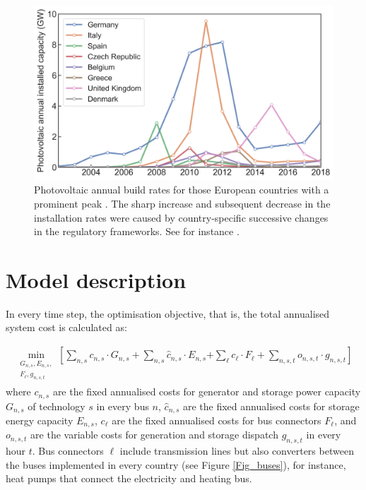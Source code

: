 \documentclass[3p]{elsarticle} %
\begin{document}
\begin{figure}[!h]
\centering
\includegraphics[width=12cm]{figures/installation_rates_PV.png}
\caption{Photovoltaic annual build rates for those European countries with a prominent peak \cite{IRENA_2019}. The sharp increase and subsequent decrease in the installation rates were caused by country-specific successive changes in the regulatory frameworks. See for instance \cite{Report_Fraunhofer_2019, Victoria_2012}. } \label{fig_installation_rates_PV} 
\end{figure}
 
\FloatBarrier

\section{Model description}

In every time step, the optimisation objective, that is, the total annualised system cost is calculated as:

\begin{align}
 \min_{\substack{G_{n,s},E_{n,s},\\F_\ell,g_{n,s,t}}} \left[ \sum_{n,s} c_{n,s} \cdot G_{n,s} +\sum_{n,s} \hat{c}_{n,s} \cdot E_{n,s} \right. \nonumber 
\left. + \sum_{\ell} c_{\ell} \cdot F_{\ell}+ \sum_{n,s,t} o_{n,s,t} \cdot g_{n,s,t} \right]
\label{eq_objective}
\end{align}
where $c_{n,s}$ are the fixed annualised costs for generator and storage power capacity $G_{n,s}$ of technology $s$ in every bus $n$, $\hat{c}_{n,s}$ are the fixed annualised costs for storage energy capacity $E_{n,s}$, $c_\ell$ are the fixed annualised costs for bus connectors $F_{\ell}$, and $o_{n,s,t}$ are the variable costs for generation and storage dispatch $g_{n,s,t}$ in every hour $t$. Bus connectors $\ell$ include transmission lines but also converters between the buses implemented in every country (see Figure \ref{Fig_buses}), for instance, heat pumps that connect the electricity and heating bus. \\
\end{document}
